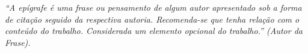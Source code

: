 \renewcommand{\epigraphname}{EPÍGRAFE}

\begin{epigrafe}

\textit{“A epígrafe é uma frase ou pensamento de algum autor apresentado
sob a forma de citação seguido da respectiva autoria. Recomenda-se
que tenha relação com o conteúdo do trabalho. Considerada um
elemento opcional do trabalho.” (Autor da Frase).}

\end{epigrafe}


